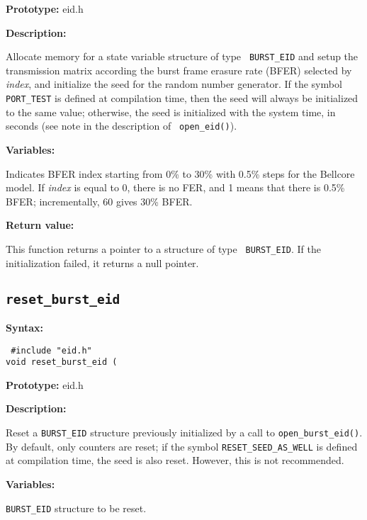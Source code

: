 {\bf Prototype: }    eid.h

{\bf Description: }

Allocate memory for a state variable structure of type {\tt
BURST\_EID} and setup the transmission matrix according the burst
frame erasure rate (BFER) selected by {\em index}, and initialize the
seed for the random number generator. If the symbol {\tt PORT\_TEST}
is defined at compilation time, then the seed will always be
initialized to the same value; otherwise, the seed is initialized with
the system time, in seconds (see note in the description of {\tt
open\_eid()}).

{\bf Variables: }
\begin{Descr}{\DescrLen}
\item[\pbox{20mm}{\em index}] %

        Indicates BFER index starting from 0\% to 30\% with 0.5\%
        steps for the Bellcore model. If {\em index} is equal to 0,
        there is no FER, and 1 means that there is 0.5\% BFER;
        incrementally, 60 gives 30\% BFER.\\
\end{Descr}


{\bf Return value: }

This function returns a pointer to a structure of type {\tt
BURST\_EID}. If the initialization failed, it returns a null pointer.


\subsection{{\tt reset\_burst\_eid}}

{\bf Syntax: }

{\tt
\#include "eid.h"\\
void reset\_burst\_eid (
}

{\bf Prototype: }    eid.h

{\bf Description: }

Reset a {\tt BURST\_EID} structure previously initialized by a call to
{\tt open\_burst\_eid()}. By default, only counters are reset; if the
symbol {\tt RESET\_SEED\_AS\_WELL} is defined at compilation time, the
seed is also reset. However, this is not recommended.

{\bf Variables: }
\begin{Descr}{\DescrLen}
\item[\pbox{20mm}{\em burst\_eid}] %
        {\tt BURST\_EID} structure to be reset.
\end{Descr}

